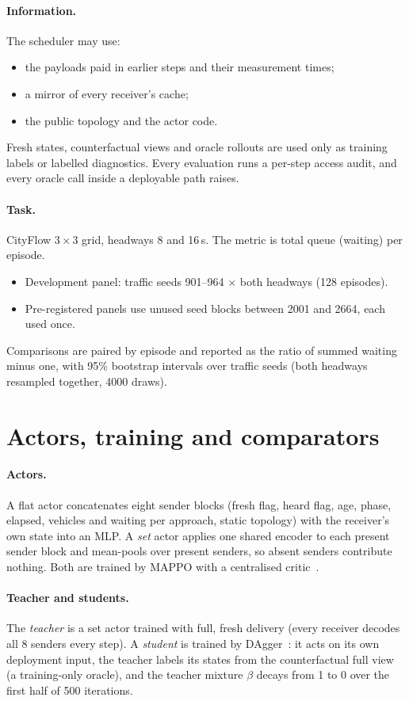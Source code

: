 \documentclass[11pt]{article}
\theoremstyle{definition}
\begin{document}
\paragraph{Information.} The scheduler may use:
\begin{itemize}
\item the payloads paid in earlier steps and their measurement times;
\item a mirror of every receiver's cache;
\item the public topology and the actor code.
\end{itemize}
Fresh states, counterfactual views and oracle rollouts are used only as training labels or labelled diagnostics. Every
evaluation runs a per-step access audit, and every oracle call inside a deployable path raises.
\paragraph{Task.} CityFlow $3\times3$ grid, headways 8 and 16\,s. The metric is total queue (waiting) per episode.
\begin{itemize}
\item Development panel: traffic seeds 901--964 $\times$ both headways (128 episodes).
\item Pre-registered panels use unused seed blocks between 2001 and 2664, each used once.
\end{itemize}
Comparisons are paired by episode and reported as the ratio of summed waiting minus one, with 95\% bootstrap intervals
over traffic seeds (both headways resampled together, 4000 draws).

\section{Actors, training and comparators}\label{sec:methods}
\paragraph{Actors.} A flat actor concatenates eight sender blocks (fresh flag, heard flag, age, phase, elapsed,
vehicles and waiting per approach, static topology) with the receiver's own state into an MLP. A \emph{set} actor applies
one shared encoder to each present sender block and mean-pools over present senders, so absent senders contribute
nothing. Both are trained by MAPPO with a centralised critic~\cite{mappo}.
\paragraph{Teacher and students.} The \emph{teacher} is a set actor trained with full, fresh delivery (every receiver
decodes all 8 senders every step). A \emph{student} is trained by DAgger~\cite{dagger}: it acts on its own deployment
input, the teacher labels its states from the counterfactual full view (a training-only oracle), and the teacher mixture
$\beta$ decays from 1 to 0 over the first half of 500 iterations.
\end{document}
